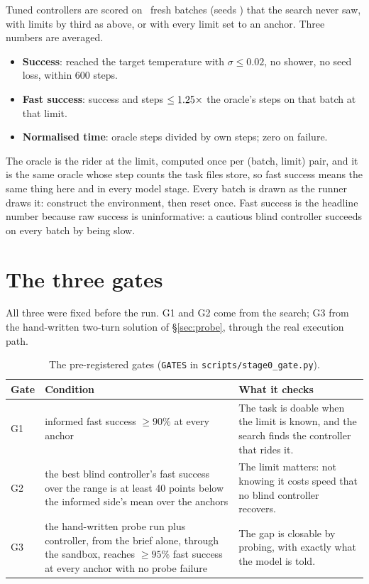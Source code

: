 \documentclass[11pt,a4paper]{article}
\begin{document}
Tuned controllers are scored on \SZnfresh\ fresh batches (seeds
\SZfreshseeds) that the search never saw, with limits by third as above,
or with every limit set to an anchor. Three numbers are averaged.
\begin{itemize}[leftmargin=1.5em]
  \item \textbf{Success}: reached the target temperature with $\sigma\le0.02$,
  no shower, no seed loss, within 600 steps.
  \item \textbf{Fast success}: success and steps $\le 1.25\times$ the
  oracle's steps on that batch at that limit.
  \item \textbf{Normalised time}: oracle steps divided by own steps; zero on
  failure.
\end{itemize}
The oracle is the rider at the limit, computed once per (batch, limit) pair,
and it is the same oracle whose step counts the task files store, so fast
success means the same thing here and in every model stage. Every batch is
drawn as the runner draws it: construct the environment, then reset once.
Fast success is the headline number because raw success is uninformative: a
cautious blind controller succeeds on every batch by being slow.

\section{The three gates}
\label{sec:gates}

All three were fixed before the run. G1 and G2 come from the search; G3
from the hand-written two-turn solution of \S\ref{sec:probe}, through the
real execution path.

\begin{table}[h]
\centering\small
\begin{tabular}{@{}lp{5.0cm}p{6.4cm}@{}}
\toprule
Gate & Condition & What it checks \\
\midrule
G1 & informed fast success $\ge 90\%$ at every anchor &
  The task is doable when the limit is known, and the search finds the
  controller that rides it. \\
G2 & the best blind controller's fast success over the range is at least 40
  points below the informed side's mean over the anchors &
  The limit matters: not knowing it costs speed that no blind controller
  recovers. \\
G3 & the hand-written probe run plus controller, from the brief alone,
  through the sandbox, reaches $\ge 95\%$ fast success at every anchor with
  no probe failure &
  The gap is closable by probing, with exactly what the model is told. \\
\bottomrule
\end{tabular}
\caption{The pre-registered gates (\texttt{GATES} in
\texttt{scripts/stage0\_gate.py}).}
\label{tab:gates}
\end{table}
\end{document}
